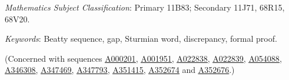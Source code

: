 \documentclass[12pt]{article}
\newcommand{\seqnum}[1]{\href{https://oeis.org/#1}{\underline{#1}}}
\theoremstyle{plain}
\theoremstyle{remark}
\begin{document}
\bigskip
{} \emph{Mathematics Subject Classification}: Primary 11B83; Secondary 11J71, 68R15,
68V20.

\noindent \emph{Keywords}: Beatty sequence, gap, Sturmian word, discrepancy, formal proof.

\begin{sloppypar}
\noindent (Concerned with sequences
\seqnum{A000201}, \seqnum{A001951}, \seqnum{A022838}, \seqnum{A022839}, \seqnum{A054088},
\seqnum{A346308}, \seqnum{A347469}, \seqnum{A347793}, \seqnum{A351415}, \seqnum{A352674} and
\seqnum{A352676}.)
\end{sloppypar}
\end{document}

